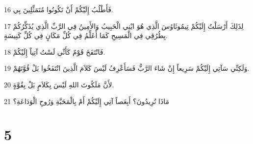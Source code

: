 \par 16 فَأَطْلُبُ إِلَيْكُمْ أَنْ تَكُونُوا مُتَمَثِّلِينَ بِي.
\par 17 لِذَلِكَ أَرْسَلْتُ إِلَيْكُمْ تِيمُوثَاوُسَ الَّذِي هُوَ ابْنِي الْحَبِيبُ وَالأَمِينُ فِي الرَّبِّ الَّذِي يُذَكِّرُكُمْ بِطُرُقِي فِي الْمَسِيحِ كَمَا أُعَلِّمُ فِي كُلِّ مَكَانٍ فِي كُلِّ كَنِيسَةٍ.
\par 18 فَانْتَفَخَ قَوْمٌ كَأَنِّي لَسْتُ آتِياً إِلَيْكُمْ.
\par 19 وَلَكِنِّي سَآتِي إِلَيْكُمْ سَرِيعاً إِنْ شَاءَ الرَّبُّ فَسَأَعْرِفُ لَيْسَ كَلاَمَ الَّذِينَ انْتَفَخُوا بَلْ قُوَّتَهُمْ.
\par 20 لأَنَّ مَلَكُوتَ اللهِ لَيْسَ بِكَلاَمٍ بَلْ بِقُوَّةٍ.
\par 21 مَاذَا تُرِيدُونَ؟ أَبِعَصاً آتِي إِلَيْكُمْ أَمْ بِالْمَحَبَّةِ وَرُوحِ الْوَدَاعَةِ؟

\chapter{5}

